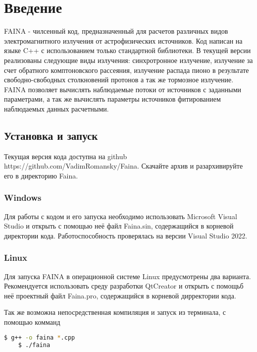 \chapter*{Введение}					
FAINA - чилсенный код, предназначенный для расчетов различных видов электромагнитного излучения от астрофизических источников. Код написан на языке C++ с использованием только стандартной библиотеки. В текущей версии реализованы следующие виды излучения: синхротронное излучение, излучение за счет обратного комптоновского рассеяния, излучение распада пионо в результате свободно-свободных столкновений протонов а так же тормозное излучение. FAINA позволяет вычислять наблюдаемые потоки от источников с заданными параметрами, а так же вычислять параметры источников фитированием наблюдаемых данных расчетными.

\section*{Установка и запуск}

Текущая версия кода доступна на github https://github.com/VadimRomansky/Faina. Скачайте архив и разархивируйте его в директорию Faina. 
\subsection{Windows}
Для работы с кодом и его запуска необходимо использовать Microsoft Visual Studio и открыть с помощью неё файл Faina.sin, содержащийся в корневой директории кода. Работоспособность проверялась на версии Visual Studio 2022.
\subsection{Linux}
Для запуска FAINA в операционной системе Linux предусмотрены два варианта. Рекомендуется использовать среду разработки QtCreator и открыть с помощьб неё проектный файл Faina.pro, содержащийся в корневой дирректории кода. 

Так же возможна непосредственная компиляция и запуск из терминала, с помощью комманд
\begin{lstlisting}[language=bash]
	$ g++ -o faina *.cpp
	$ ./faina
\end{lstlisting}



